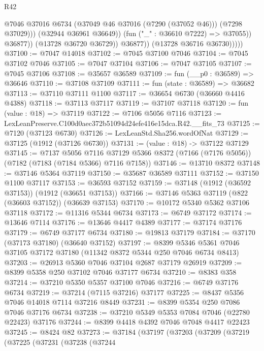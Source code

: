 \begin{lexlean}{R42}
\begin{coremodule}
{                              @7046
                              @37016
                              @6734
                              (@37049 @46 @37016 (@7290 (@37052 @46)))
                              (@7298 @37029)))
                          (@32944 @36961 @36649))
                        (fun ("_" : @36610 @7222) => @37055))
                      @36877))
                  (@13728 @36720 @36729))
                @36877))
            (@13728 @36716 @36730)))))
@37100 := @7047 @14018
@37102 := @7045 @37100 @7046
@37104 := @7045 @37102 @7046
@37105 := @7047 @37104
@37106 := @7047 @37105
@37107 := @7045 @37106
@37108 := @35657 @36589
@37109 := fun (__p0 : @36589) => @36646
@37110 := @37108 @37109
@37111 := fun (state : @36589) => @36682
@37113 := @37110 @37111 @1100
@37117 := @36654 @6730 (@36660 @4416 @4388)
@37118 := @37113 @37117
@37119 := @37107 @37118
@37120 := fun (value : @18) => @37119
@37122 := @7106 @5056 @7116
@37123 := LexLeanPreserve.C100d0aec372b51094d24efe416e15dca.R42.__fits_73
@37125 := @7120 (@37123 @6730)
@37126 := LexLeanStd.Sha256.wordOfNat
@37129 := @37125 (@1912 (@37126 @6730))
@37131 := (value : @18) -> @37122 @37129
@37145 := @7137
    @5056
    @7116
    @37129
    @5366
    @8372
    (@7166 (@7176 @5056))
    (@7182 (@7183 (@7184 @5366) @7116 @7158))
@37146 := @13710 @8372
@37148 := @37146 @5364 @37119
@37150 := @35687 @36589 @37111
@37152 := @37150 @1100 @37117
@37153 := @36593 @37152
@37159 := @37148 (@1912 (@36592 @37153)) (@1912 (@36651 @37153))
@37166 := @37146 @5363 @37119 (@822 (@36603 @37152)) (@36639 @37153)
@37170 := @10172 @5340 @5362 @37106 @37118
@37172 := @11316 @5344 @6734
@37173 := @6749 @37172
@37174 := @13646 @7114
@37176 := @13646 @4417 @4389
@37177 := @37174 @37176
@37179 := @6749 @37177 @6734
@37180 := @19813 @37179
@37184 := @37170 (@37173 @37180) (@36640 @37152)
@37197 := @8399 @5346 @5361 @7046 @37105 @37172 @37180 (@11342 @8372 @5344 @250 @7046 @6734 @8413)
@37203 := @26913 @5360 @7046 @37104 @2687 @37179 @26919
@37209 := @8399 @5358 @250 @37102 @7046 @37177 @6734
@37210 := @8383 @358
@37214 := @37210 @5350 @5357 @37100 @7046
@37216 := @6749 @37176 @6734
@37219 := @37214 (@7115 @37216) @37177
@37225 := @8437 @5356 @7046 @14018 @7114 @37216 @8449
@37231 := @8399 @5354 @250 @7086 @7046 @37176 @6734
@37238 := @37210 @5349 @5353 @7084 @7046 (@22780 @22423) @37176
@37244 := @8399 @4418 @4392 @7046 @7048 @4417 @22423
@37245 := @8424 @82
@37273 := @37184
    (@37197
      (@37203
        (@37209
          (@37219
            (@37225
              (@37231
                (@37238
                  (@37244
}
\end{coremodule}
\end{lexlean}
